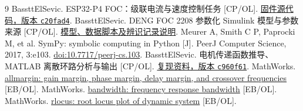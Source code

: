 \documentclass[UTF8,fontset=windows,11pt,a4paper]{ctexart}
\begin{document}
\begingroup\small
\renewcommand{\refname}{参考文献}
\begin{thebibliography}{9}\setlength{\itemsep}{0pt}\setlength{\parskip}{0pt}
 BassttElSevic. ESP32-P4 FOC：级联电流与速度控制任务 [CP/OL].
\href{https://github.com/BassttElSevic/esp32p4-foc/blob/c20fad4021fcaa4c48edd10f71dbba7408f10d8e/firmware/foc/main/main.c}{固件源代码，版本 \texttt{c20fad4}}.
 BassttElSevic. DENG FOC 2208 参数化 Simulink 模型与参数来源 [CP/OL].
\href{https://github.com/BassttElSevic/esp32p4-foc/tree/c960f61/simulink}{模型、数据脚本及辨识记录说明}.
 Meurer A, Smith C P, Paprocki M, et al. SymPy: symbolic computing in Python [J]. PeerJ Computer Science, 2017, 3:e103. \href{https://doi.org/10.7717/peerj-cs.103}{doi:10.7717/peerj-cs.103}.
 BassttElSevic. 电机传递函数推导、MATLAB 离散环路分析与输出 [CP/OL].
\href{https://github.com/BassttElSevic/esp32p4-foc/tree/c960f61/analysis}{复现资料，版本 \texttt{c960f61}}.
 MathWorks. \href{https://www.mathworks.com/help/control/ref/dynamicsystem.allmargin.html}{allmargin: gain margin, phase margin, delay margin, and crossover frequencies} [EB/OL].
 MathWorks. \href{https://www.mathworks.com/help/control/ref/dynamicsystem.bandwidth.html}{bandwidth: frequency response bandwidth} [EB/OL].
 MathWorks. \href{https://www.mathworks.com/help/control/ref/dynamicsystem.rlocus.html}{rlocus: root locus plot of dynamic system} [EB/OL].
\end{thebibliography}
\endgroup
\end{document}
